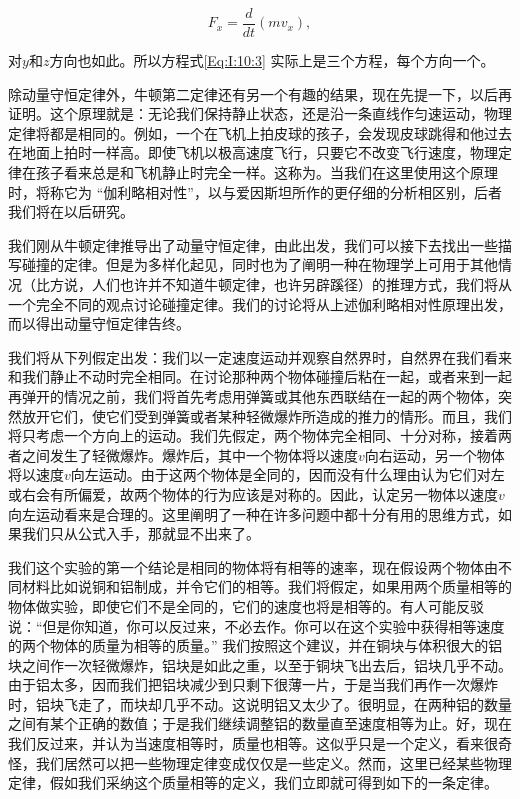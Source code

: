\documentclass[12pt,oneside]{book}
\providecommand{\ddt}[2]{\frac{d#1}{d#2}}
\begin{document}
\begin{equation}
\label{Eq:I:10:5}
F_x=\ddt{}{t}(mv_x),
\end{equation}

对$y$和$z$方向也如此。所以方程式\eqref{Eq:I:10:3} 实际上是三个方程，每个方向一个。

除动量守恒定律外，牛顿第二定律还有另一个有趣的结果，现在先提一下，以后再证明。这个原理就是：无论我们保持静止状态，还是沿一条直线作匀速运动，物理定律将都是相同的。例如，一个在飞机上拍皮球的孩子，会发现皮球跳得和他过去在地面上拍时一样高。即使飞机以极高速度飞行，只要它不改变飞行速度，物理定律在孩子看来总是和飞机静止时完全一样。这称为。当我们在这里使用这个原理时，将称它为 “伽利略相对性”，以与爱因斯坦所作的更仔细的分析相区别，后者我们将在以后研究。

我们刚从牛顿定律推导出了动量守恒定律，由此出发，我们可以接下去找出一些描写碰撞的定律。但是为多样化起见，同时也为了阐明一种在物理学上可用于其他情况（比方说，人们也许并不知道牛顿定律，也许另辟蹊径）的推理方式，我们将从一个完全不同的观点讨论碰撞定律。我们的讨论将从上述伽利略相对性原理出发，而以得出动量守恒定律告终。

我们将从下列假定出发：我们以一定速度运动并观察自然界时，自然界在我们看来和我们静止不动时完全相同。在讨论那种两个物体碰撞后粘在一起，或者来到一起再弹开的情况之前，我们将首先考虑用弹簧或其他东西联结在一起的两个物体，突然放开它们，使它们受到弹簧或者某种轻微爆炸所造成的推力的情形。而且，我们将只考虑一个方向上的运动。我们先假定，两个物体完全相同、十分对称，接着两者之间发生了轻微爆炸。爆炸后，其中一个物体将以速度$v$向右运动，另一个物体将以速度$v$向左运动。由于这两个物体是全同的，因而没有什么理由认为它们对左或右会有所偏爱，故两个物体的行为应该是对称的。因此，认定另一物体以速度$v$向左运动看来是合理的。这里阐明了一种在许多问题中都十分有用的思维方式，如果我们只从公式入手，那就显不出来了。

我们这个实验的第一个结论是相同的物体将有相等的速率，现在假设两个物体由不同材料比如说铜和铝制成，并令它们的相等。我们将假定，如果用两个质量相等的物体做实验，即使它们不是全同的，它们的速度也将是相等的。有人可能反驳说：“但是你知道，你可以反过来，不必去作。你可以在这个实验中获得相等速度的两个物体的质量为相等的质量。” 我们按照这个建议，并在铜块与体积很大的铝块之间作一次轻微爆炸，铝块是如此之重，以至于铜块飞出去后，铝块几乎不动。由于铝太多，因而我们把铝块减少到只剩下很薄一片，于是当我们再作一次爆炸时，铝块飞走了，而块却几乎不动。这说明铝又太少了。很明显，在两种铝的数量之间有某个正确的数值；于是我们继续调整铝的数量直至速度相等为止。好，现在我们反过来，并认为当速度相等时，质量也相等。这似乎只是一个定义，看来很奇怪，我们居然可以把一些物理定律变成仅仅是一些定义。然而，这里已经某些物理定律，假如我们采纳这个质量相等的定义，我们立即就可得到如下的一条定律。
\end{document}
